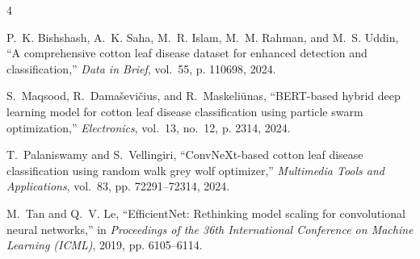 \documentclass[journal,10pt,twocolumn]{IEEEtran}
\begin{document}
\begin{thebibliography}{4}

P.~K. Bishshash, A.~K. Saha, M.~R. Islam, M.~M. Rahman, and M.~S. Uddin, ``A comprehensive cotton leaf disease dataset for enhanced detection and classification,'' \emph{Data in Brief}, vol.~55, p. 110698, 2024.

S.~Maqsood, R.~Damaševičius, and R.~Maskeliūnas, ``BERT-based hybrid deep learning model for cotton leaf disease classification using particle swarm optimization,'' \emph{Electronics}, vol.~13, no.~12, p. 2314, 2024.

T.~Palaniswamy and S.~Vellingiri, ``ConvNeXt-based cotton leaf disease classification using random walk grey wolf optimizer,'' \emph{Multimedia Tools and Applications}, vol.~83, pp. 72291--72314, 2024.

M.~Tan and Q.~V. Le, ``EfficientNet: Rethinking model scaling for convolutional neural networks,'' in \emph{Proceedings of the 36th International Conference on Machine Learning (ICML)}, 2019, pp. 6105--6114.

\end{thebibliography}
\end{document}
